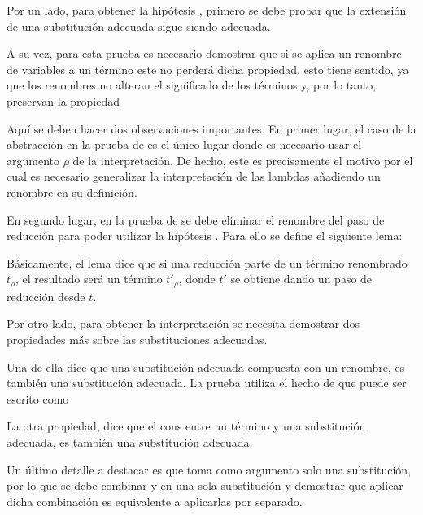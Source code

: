 Por un lado, para obtener la hipótesis \snstar {}, primero se debe probar que la extensión de una substitución adecuada sigue siendo adecuada.


A su vez, para esta prueba es necesario demostrar que si se aplica un renombre de variables a un término \snstar este no perderá dicha propiedad, esto tiene sentido, ya que los renombres no alteran el significado de los términos y, por lo tanto, preservan la propiedad \snstar


Aquí se deben hacer dos observaciones importantes.
En primer lugar, el caso de la abstracción en la prueba de  es el único lugar donde es necesario usar el argumento $\rho$ de la interpretación.
De hecho, este es precisamente el motivo por el cual es necesario generalizar la interpretación de las lambdas añadiendo un renombre en su definición.

En segundo lugar, en la prueba de  se debe eliminar el renombre del paso de reducción para poder utilizar la hipótesis .
Para ello se define el siguiente lema:


Básicamente, el lema dice que si una reducción parte de un término renombrado $t_\rho$, el resultado será un término $t'_\rho$, donde $t'$ se obtiene dando un paso de reducción desde $t$.


Por otro lado, para obtener la interpretación  se necesita demostrar dos propiedades más sobre las substituciones adecuadas.

Una de ella dice que una substitución adecuada compuesta con un renombre, es también una substitución adecuada.
La prueba utiliza el hecho de que   puede ser escrito como
\subst{\comp{\ids}{\bound{$\rho$}}}{}


La otra propiedad, dice que el cons entre un término \snstar y una substitución adecuada, es también una substitución adecuada.


Un último detalle a destacar es que  toma como argumento solo una substitución, por lo que se debe combinar \bound{$\sigma$} y
en una sola substitución y demostrar que aplicar dicha combinación es equivalente a aplicarlas por separado.


